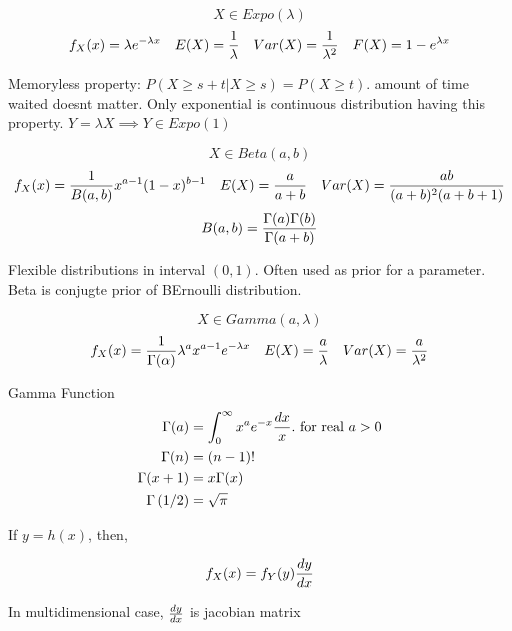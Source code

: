 \begin{slide}
 \begin{shaded}
    $$X \in Expo(\lambda)$$
    $$
    f_X(x) = \lambda e^{-\lambda x} 
    \quad
    E(X)   = {1 \over \lambda}
    \quad
    Var(X) = {1 \over \lambda^2}
    \quad 
    F(X)   = 1-e^{\lambda x}
    $$
  \end{shaded}
Memoryless property: $P(X\geq s+t|X\geq s) = P(X\geq t)$. amount of time waited doesnt matter. Only exponential is continuous distribution having this property.
  $Y = \lambda X \implies Y\in Expo(1)$

\end{slide}


\begin{slide} 
 \begin{shaded}
    $$X \in Beta(a,b)$$
    $$
    f_X(x) = {1\over B(a,b) } x^{a-1}(1-x)^{b-1} 
    \quad
    E(X)   = {a\over a+b}
    \quad
    Var(X) = {ab\over (a+b)^2(a+b+1)}
    $$
    $$ 
    B(a,b)   = {\Gamma(a)\Gamma(b)\over\Gamma(a+b)}
    $$
  \end{shaded}
Flexible distributions in interval $(0,1)$. Often used as prior for a parameter. 
Beta is conjugte prior of BErnoulli distribution.
\end{slide}

\begin{slide}
 \begin{shaded}
    $$X \in Gamma(a,\lambda)$$
    $$
    f_X(x) = {1 \over \Gamma(\alpha)} \lambda^a x^{a-1}e^{-\lambda x}  
    \quad
    E(X)   = {a\over \lambda}
    \quad
    Var(X) = {a\over \lambda^2}
    $$
  \end{shaded}
Gamma Function
  \begin{align*}
\Gamma(a) &= \int_0^\infty x^a e^{-x}{dx\over x}. \text{ for real } a>0
\\
\Gamma(n) &=(n-1)!
\\
\Gamma(x+1) &= x\Gamma(x)
\\
\Gamma\left({1/2}\right) &=  \sqrt{\pi}
\end{align*}
\end{slide}

\begin{slide}
\noindent{}If $y = h(x)$, then, 
\begin{shaded}
  {\huge
  $$f_X(x) = f_Y(y){dy \over dx}$$
  }
\end{shaded}
\noindent In multidimensional case, ${dy\over dx}$ is jacobian matrix
\end{slide}

